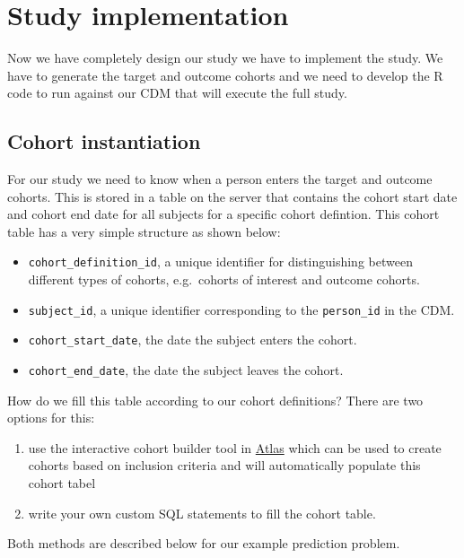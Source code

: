 \documentclass[]{article}
\providecommand{\tightlist}{%
  \setlength{\itemsep}{0pt}\setlength{\parskip}{0pt}}
\begin{document}
\section{Study implementation}\label{study-implementation}

Now we have completely design our study we have to implement the study.
We have to generate the target and outcome cohorts and we need to
develop the R code to run against our CDM that will execute the full
study.

\subsection{Cohort instantiation}\label{cohort-instantiation}

For our study we need to know when a person enters the target and
outcome cohorts. This is stored in a table on the server that contains
the cohort start date and cohort end date for all subjects for a
specific cohort defintion. This cohort table has a very simple structure
as shown below:

\begin{itemize}
\tightlist
\item
  \texttt{cohort\_definition\_id}, a unique identifier for
  distinguishing between different types of cohorts, e.g.~cohorts of
  interest and outcome cohorts.
\item
  \texttt{subject\_id}, a unique identifier corresponding to the
  \texttt{person\_id} in the CDM.
\item
  \texttt{cohort\_start\_date}, the date the subject enters the cohort.
\item
  \texttt{cohort\_end\_date}, the date the subject leaves the cohort.
\end{itemize}

How do we fill this table according to our cohort definitions? There are
two options for this:

\begin{enumerate}
\def\labelenumi{\arabic{enumi})}
\item
  use the interactive cohort builder tool in
  \href{www.github.com/OHDSI/Atlas}{Atlas} which can be used to create
  cohorts based on inclusion criteria and will automatically populate
  this cohort tabel
\item
  write your own custom SQL statements to fill the cohort table.
\end{enumerate}

Both methods are described below for our example prediction problem.
\end{document}
